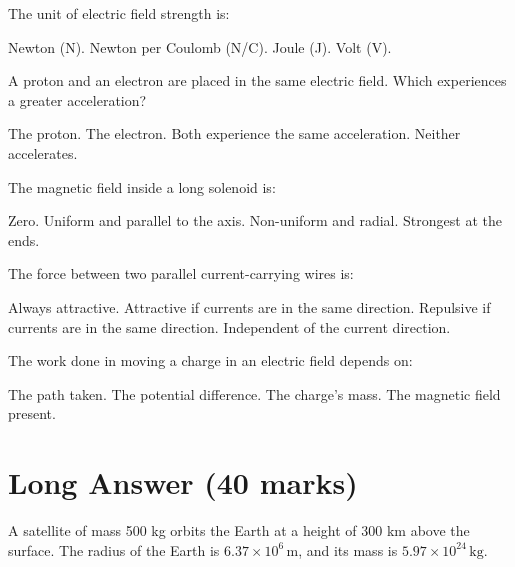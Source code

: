 \documentclass[addpoints]{exam}
\begin{document}
\begin{questions}
\question[1] The unit of electric field strength is:
\begin{choices}
    \choice Newton (N).
    \correctchoice Newton per Coulomb (N/C).
    \choice Joule (J).
    \choice Volt (V).
\end{choices}
\vspace{8mm}
\vspace{8mm}
\question[1] A proton and an electron are placed in the same electric field. Which experiences a greater acceleration?
\begin{choices}
    \choice The proton.
    \correctchoice The electron.
    \choice Both experience the same acceleration.
    \choice Neither accelerates.
\end{choices}
\vspace{8mm}

\question[1] The magnetic field inside a long solenoid is:
\begin{choices}
    \choice Zero.
    \correctchoice Uniform and parallel to the axis.
    \choice Non-uniform and radial.
    \choice Strongest at the ends.
\end{choices}
\vspace{8mm}

\question[1] The force between two parallel current-carrying wires is:
\begin{choices}
    \choice Always attractive.
    \correctchoice Attractive if currents are in the same direction.
    \choice Repulsive if currents are in the same direction.
    \choice Independent of the current direction.
\end{choices}
\vspace{8mm}

\question[1] The work done in moving a charge in an electric field depends on:
\begin{choices}
    \choice The path taken.
    \correctchoice The potential difference.
    \choice The charge's mass.
    \choice The magnetic field present.
\end{choices}
\vspace{8mm}


\section*{Long Answer (40 marks)}

\question A satellite of mass 500 kg orbits the Earth at a height of 300 km above the surface. The radius of the Earth is \(6.37 \times 10^6 \, \text{m}\), and its mass is \(5.97 \times 10^{24} \, \text{kg}\).
\begin{parts}

\end{parts}
\end{questions}
\end{document}
